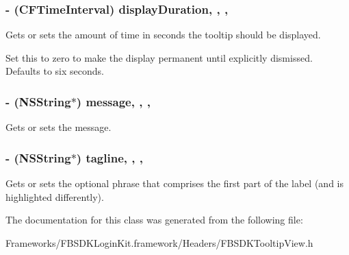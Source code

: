 \subsubsection[{display\+Duration}]{\setlength{\rightskip}{0pt plus 5cm}-\/ (C\+F\+Time\+Interval) display\+Duration\hspace{0.3cm}{\ttfamily [read]}, {\ttfamily [write]}, {\ttfamily [nonatomic]}, {\ttfamily [assign]}}\label{interface_f_b_s_d_k_tooltip_view_ac94d81890eb496c7afc56277586f938f}
Gets or sets the amount of time in seconds the tooltip should be displayed.

Set this to zero to make the display permanent until explicitly dismissed. Defaults to six seconds. \hypertarget{interface_f_b_s_d_k_tooltip_view_af6b9bdb1ec818c555c7cde749f22d62c}{}
\subsubsection[{message}]{\setlength{\rightskip}{0pt plus 5cm}-\/ (N\+S\+String$\ast$) message\hspace{0.3cm}{\ttfamily [read]}, {\ttfamily [write]}, {\ttfamily [nonatomic]}, {\ttfamily [copy]}}\label{interface_f_b_s_d_k_tooltip_view_af6b9bdb1ec818c555c7cde749f22d62c}
Gets or sets the message. \hypertarget{interface_f_b_s_d_k_tooltip_view_a48a5512acd97a1af6fbf64e2689e21e2}{}
\subsubsection[{tagline}]{\setlength{\rightskip}{0pt plus 5cm}-\/ (N\+S\+String$\ast$) tagline\hspace{0.3cm}{\ttfamily [read]}, {\ttfamily [write]}, {\ttfamily [nonatomic]}, {\ttfamily [copy]}}\label{interface_f_b_s_d_k_tooltip_view_a48a5512acd97a1af6fbf64e2689e21e2}
Gets or sets the optional phrase that comprises the first part of the label (and is highlighted differently). 

The documentation for this class was generated from the following file\+:\begin{DoxyCompactItemize}
\item 
Frameworks/\+F\+B\+S\+D\+K\+Login\+Kit.\+framework/\+Headers/F\+B\+S\+D\+K\+Tooltip\+View.\+h\end{DoxyCompactItemize}
